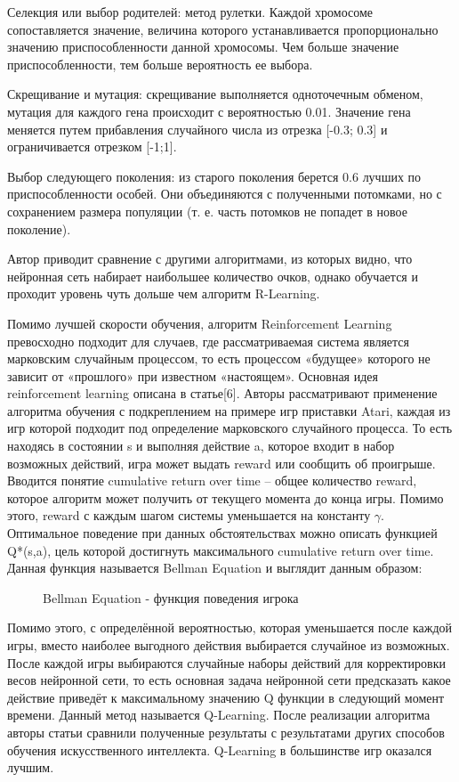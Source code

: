Селекция или выбор родителей: метод рулетки. Каждой хромосоме сопоставляется значение, величина которого устанавливается пропорционально значению приспособленности данной хромосомы. Чем больше значение приспособленности, тем больше вероятность ее выбора.

Скрещивание и мутация: скрещивание выполняется одноточечным обменом, мутация для каждого гена происходит с вероятностью 0.01. Значение гена меняется путем прибавления случайного числа из отрезка [-0.3; 0.3] и ограничивается отрезком [-1;1].

Выбор следующего поколения: из старого поколения берется 0.6 лучших по приспособленности особей. Они объединяются с полученными потомками, но с сохранением размера популяции (т. е. часть потомков не попадет в новое поколение).

Автор приводит сравнение с другими алгоритмами, из которых видно, что нейронная сеть набирает наибольшее количество очков, однако обучается и проходит уровень чуть дольше чем алгоритм R-Learning.

Помимо лучшей скорости обучения, алгоритм Reinforcement Learning превосходно подходит для случаев, где рассматриваемая система является марковским случайным процессом, то есть процессом «будущее» которого не зависит от «прошлого» при известном «настоящем». Основная идея reinforcement learning описана в статье[6]. Авторы рассматривают применение алгоритма обучения с подкреплением на примере игр приставки Atari, каждая из игр которой подходит под определение марковского случайного процесса. То есть находясь в состоянии s и выполняя действие a, которое входит в набор возможных действий, игра может выдать reward или сообщить об проигрыше. Вводится понятие cumulative return over time – общее количество reward, которое алгоритм может получить от текущего момента до конца игры. Помимо этого, reward с каждым шагом системы уменьшается на константу $\gamma$. Оптимальное поведение при данных обстоятельствах можно описать функцией Q*(s,a), цель которой достигнуть максимального cumulative return over time. Данная функция называется Bellman Equation и выглядит данным образом:
\begin{figure}[h]
    \caption{Bellman Equation - функция поведения игрока}
\end{figure}

Помимо этого, с определённой вероятностью, которая уменьшается после каждой игры, вместо наиболее выгодного действия выбирается случайное из возможных. После каждой игры выбираются случайные наборы действий для корректировки весов нейронной сети, то есть основная задача нейронной сети предсказать какое действие приведёт к максимальному значению Q функции в следующий момент времени. Данный метод называется Q-Learning. После реализации алгоритма авторы статьи сравнили полученные результаты с результатами других способов обучения искусственного интеллекта. Q-Learning в большинстве игр оказался лучшим.
